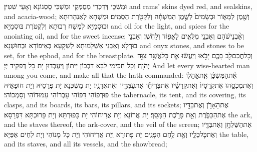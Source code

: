 {וּמַשְׁכֵּי דְּדִכְרֵי מְסֻמְּקֵי וּמַשְׁכֵּי סָסְגוֹנָא וְאָעֵי שִׁטִּין׃}
{and rams’ skins dyed red, and sealskins, and acacia-wood;}{}
{וְשֶׁ֖מֶן לַמָּא֑וֹר וּבְשָׂמִים֙ לְשֶׁ֣מֶן הַמִּשְׁחָ֔ה וְלִקְטֹ֖רֶת הַסַּמִּֽים׃}
{וּמִשְׁחָא לְאַנְהָרוּתָא וּבוּסְמַיָּא לִמְשַׁח רְבוּתָא וְלִקְטֹרֶת בּוּסְמַיָּא׃}
{and oil for the light, and spices for the anointing oil, and for the sweet incense;}{}
{וְאַ֨בְנֵי\maqqaf שֹׁ֔הַם וְאַבְנֵ֖י מִלֻּאִ֑ים לָאֵפ֖וֹד וְלַחֹֽשֶׁן׃}
{וְאַבְנֵי בוּרְלָא וְאַבְנֵי אַשְׁלָמוּתָא לְשַׁקָּעָא בְּאֵיפוֹדָא וּבְחוּשְׁנָא׃}
{and onyx stones, and stones to be set, for the ephod, and for the breastplate.}{}
{וְכׇל\maqqaf חֲכַם\maqqaf לֵ֖ב בָּכֶ֑ם יָבֹ֣אוּ וְיַעֲשׂ֔וּ אֵ֛ת כׇּל\maqqaf אֲשֶׁ֥ר צִוָּ֖ה יְהֹוָֽה׃}
{וְכָל חַכִּימֵי לִבָּא דִּבְכוֹן יֵיתוֹן וְיַעְבְּדוּן יָת כָּל דְּפַקֵּיד יְיָ׃}
{And let every wise-hearted man among you come, and make all that the \lord\space hath commanded:}{}
{אֶ֨ת\maqqaf הַמִּשְׁכָּ֔ן אֶֽת\maqqaf אׇהֳל֖וֹ וְאֶת\maqqaf מִכְסֵ֑הוּ אֶת\maqqaf קְרָסָיו֙ וְאֶת\maqqaf קְרָשָׁ֔יו אֶת\maqqaf בְּרִיחָ֕ו אֶת\maqqaf עַמֻּדָ֖יו וְאֶת\maqqaf אֲדָנָֽיו׃}
{יָת מַשְׁכְּנָא יָת פְּרָסֵיהּ וְיָת חוּפָאֵיהּ פּוּרְפוֹהִי דַּפּוֹהִי עָבְרוֹהִי עַמּוּדוֹהִי וְסָמְכוֹהִי׃}
{the tabernacle, its tent, and its covering, its clasps, and its boards, its bars, its pillars, and its sockets;}{}
{אֶת\maqqaf הָאָרֹ֥ן וְאֶת\maqqaf בַּדָּ֖יו אֶת\maqqaf הַכַּפֹּ֑רֶת וְאֵ֖ת פָּרֹ֥כֶת הַמָּסָֽךְ׃}
{יָת אֲרוֹנָא וְיָת אֲרִיחוֹהִי יָת כָּפוּרְתָּא וְיָת פָּרוּכְתָּא דִּפְרָסָא׃}
{the ark, and the staves thereof, the ark-cover, and the veil of the screen;}{}
{אֶת\maqqaf הַשֻּׁלְחָ֥ן וְאֶת\maqqaf בַּדָּ֖יו וְאֶת\maqqaf כׇּל\maqqaf כֵּלָ֑יו וְאֵ֖ת לֶ֥חֶם הַפָּנִֽים׃}
{יָת פָּתוּרָא וְיָת אֲרִיחוֹהִי וְיָת כָּל מָנוֹהִי וְיָת לְחֵים אַפַּיָּא׃}
{the table, and its staves, and all its vessels, and the showbread;}{}
